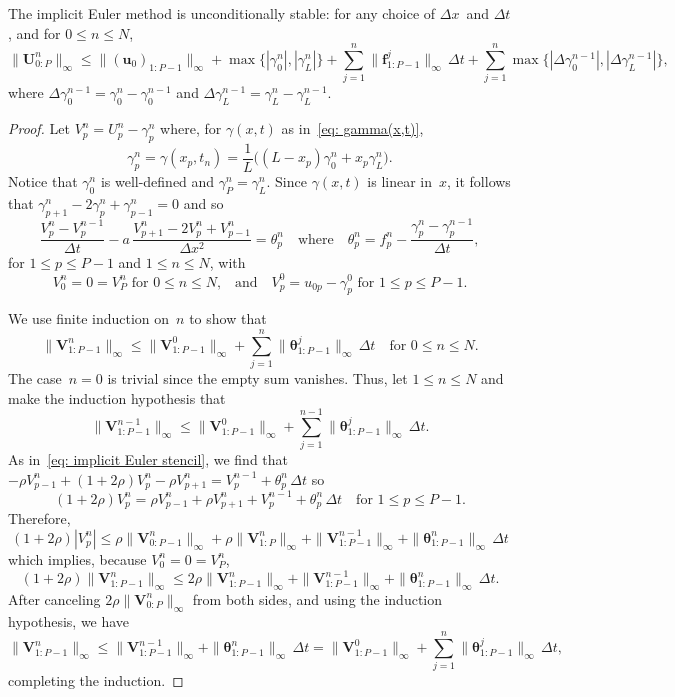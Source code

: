 \begin{theorem}
The implicit Euler method is unconditionally stable: for any choice of 
$\Delta x$~and $\Delta t$, and for $0\le n\le N$,
\[
\|\boldsymbol{U}^n_{0:P}\|_\infty
	\le\|(\boldsymbol{u}_0)_{1:P-1}\|_\infty
		+\max\bigl\{|\gamma^n_0|,|\gamma^n_L|\bigr\}
	+\sum_{j=1}^n\|\boldsymbol{f}^j_{1:P-1}\|_\infty\,\Delta t
+\sum_{j=1}^n\max\bigl\{|\Delta\gamma^{n-1}_0|,|\Delta\gamma^{n-1}_L|\bigr\},
\]
where $\Delta\gamma_0^{n-1}=\gamma_0^n-\gamma_0^{n-1}$ and
$\Delta\gamma_L^{n-1}=\gamma^n_L-\gamma^{n-1}_L$.
\end{theorem}
\begin{proof}
Let $V^n_p=U^n_p-\gamma^n_p$ where, for $\gamma(x,t)$ as
in~\eqref{eq: gamma(x,t)},
\[
\gamma^n_p=\gamma(x_p,t_n)
	=\frac{1}{L}\bigl((L-x_p)\gamma_0^n+x_p\gamma_L^n\bigr).
\]
Notice that $\gamma^n_0$ is well-defined and $\gamma^n_P=\gamma^n_L$.  Since
$\gamma(x,t)$ is linear in~$x$, it follows that
$\gamma^n_{p+1}-2\gamma^n_p+\gamma^n_{p-1}=0$ and so
\[
\frac{V^n_p-V^{n-1}_p}{\Delta t}
	-a\,\frac{V^n_{p+1}-2V^n_p+V^n_{p-1}}{\Delta x^2}=\theta^n_p
	\quad\text{where}\quad
	\theta^n_p=f^n_p-\frac{\gamma^n_p-\gamma^{n-1}_p}{\Delta t},
\]
for $1\le p\le P-1$ and $1\le n\le N$, with
\[
\text{$V^n_0=0=V^n_P$ for $0\le n\le N$,}\quad\text{and}\quad
\text{$V^0_p=u_{0p}-\gamma^0_p$ for $1\le p\le P-1$.}
\]

We use finite induction on~$n$ to show that
\[
\|\boldsymbol{V}^n_{1:P-1}\|_\infty\le\|\boldsymbol{V}^0_{1:P-1}\|_\infty
	+\sum_{j=1}^n\|\boldsymbol{\theta}^j_{1:P-1}\|_\infty\,\Delta t
		\quad\text{for $0\le n\le N$.}
\]
The case~$n=0$ is trivial since the empty sum vanishes.  Thus, let
$1\le n\le N$ and make the induction hypothesis that
\[
\|\boldsymbol{V}^{n-1}_{1:P-1}\|_\infty\le\|\boldsymbol{V}^0_{1:P-1}\|_\infty
	+\sum_{j=1}^{n-1}\|\boldsymbol{\theta}^j_{1:P-1}\|_\infty\,\Delta t.
\]
As in~\eqref{eq: implicit Euler stencil}, we find that
$-\rho V^n_{p-1}+(1+2\rho)V^n_p-\rho V^n_{p+1}=V^{n-1}_p+\theta^n_p\,\Delta t$
so
\[
(1+2\rho)V^n_p=\rho V^n_{p-1}+\rho V^n_{p+1}+V^{n-1}_p+\theta^n_p\,\Delta t
\quad\text{for $1\le p\le P-1$.}
\]
Therefore,
\[
(1+2\rho)|V^n_p|\le\rho\|\boldsymbol{V}^n_{0:P-1}\|_\infty
	+\rho\|\boldsymbol{V}^n_{1:P}\|_\infty
	+\|\boldsymbol{V}^{n-1}_{1:P-1}\|_\infty
	+\|\boldsymbol{\theta}^n_{1:P-1}\|_\infty\,\Delta t
\]
which implies, because $V^n_0=0=V^n_P$,
\[
(1+2\rho)\|\boldsymbol{V}^n_{1:P-1}\|_\infty
	\le2\rho\|\boldsymbol{V}^n_{1:P-1}\|_\infty
	+\|\boldsymbol{V}^{n-1}_{1:P-1}\|_\infty
	+\|\boldsymbol{\theta}^n_{1:P-1}\|_\infty\,\Delta t.
\]
After canceling $2\rho\|\boldsymbol{V}^n_{0:P}\|_\infty$ from both sides, and
using the induction hypothesis, we have
\[
\|\boldsymbol{V}^n_{1:P-1}\|_\infty\le\|\boldsymbol{V}^{n-1}_{1:P-1}\|_\infty
	+\|\boldsymbol{\theta}^n_{1:P-1}\|_\infty\,\Delta t
	=\|\boldsymbol{V}^0_{1:P-1}\|_\infty
	+\sum_{j=1}^n\|\boldsymbol{\theta}^j_{1:P-1}\|_\infty\,\Delta t,
\]
completing the induction.


\end{proof}
